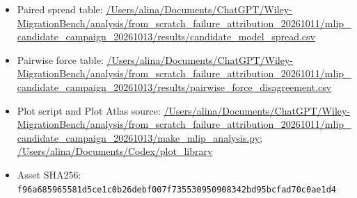 \begin{itemize}[leftmargin=1.4em,noitemsep]
\item Paired spread table: \begingroup\scriptsize\url{/Users/alina/Documents/ChatGPT/Wiley-MigrationBench/analysis/from_scratch_failure_attribution_20261011/mlip_candidate_campaign_20261013/results/candidate_model_spread.csv}\endgroup
\item Pairwise force table: \begingroup\scriptsize\url{/Users/alina/Documents/ChatGPT/Wiley-MigrationBench/analysis/from_scratch_failure_attribution_20261011/mlip_candidate_campaign_20261013/results/pairwise_force_disagreement.csv}\endgroup
\item Plot script and Plot Atlas source: \begingroup\scriptsize\url{/Users/alina/Documents/ChatGPT/Wiley-MigrationBench/analysis/from_scratch_failure_attribution_20261011/mlip_candidate_campaign_20261013/make_mlip_analysis.py}\endgroup; \url{/Users/alina/Documents/Codex/plot_library}
\item Asset SHA256: \texttt{f96a685965581d5ce1c0b26debf007f735530950908342bd95bcfad70c0ae1d4}
\end{itemize}
